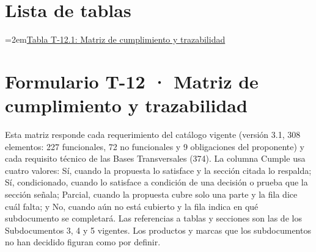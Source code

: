 \documentclass[11pt]{article}
\begin{document}

\tableofcontents
\clearpage
\section*{Lista de tablas}

\noindent\hangindent=2em\hyperref[tab:t12-1]{Tabla T-12.1: Matriz de cumplimiento y trazabilidad}\dotfill\pageref{tab:t12-1}\par\vspace{0.4\baselineskip}
\clearpage


\renewcommand{\tablename}{Tabla}
\renewcommand{\thetable}{T-12.\arabic{table}}

\section{Formulario T-12 · Matriz de cumplimiento y trazabilidad}\label{formulario-t-12}

Esta matriz responde cada requerimiento del catálogo vigente (versión 3.1, 308 elementos: 227 funcionales, 72 no funcionales y 9 obligaciones del proponente) y cada requisito técnico de las Bases Transversales (374). La columna Cumple usa cuatro valores: Sí, cuando la propuesta lo satisface y la sección citada lo respalda; Sí, condicionado, cuando lo satisface a condición de una decisión o prueba que la sección señala; Parcial, cuando la propuesta cubre solo una parte y la fila dice cuál falta; y No, cuando aún no está cubierto y la fila indica en qué subdocumento se completará. Las referencias a tablas y secciones son las de los Subdocumentos 3, 4 y 5 vigentes. Los productos y marcas que los subdocumentos no han decidido figuran como por definir.
\end{document}
